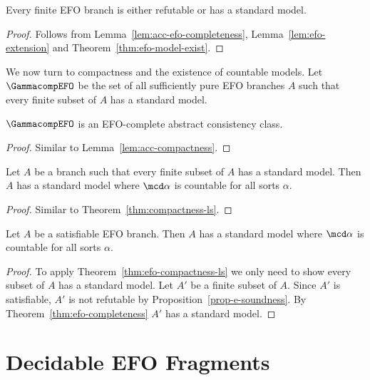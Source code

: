 \begin{thm}
  \label{thm:efo-completeness}
  Every finite EFO branch is either refutable
  or has a standard model.
\end{thm}
\begin{proof}
  Follows from Lemma~\ref{lem:acc-efo-completeness}, Lemma~\ref{lem:efo-extension} and
  Theorem~\ref{thm:efo-model-exist}.
\end{proof}

We now turn to compactness and the existence of countable models.
Let $\GammacompEFO$ be the set of all sufficiently pure
EFO branches $A$ such that every finite subset of $A$ has a standard model.

\begin{lem}
  \label{lem:acc-efo-compactness}
  $\GammacompEFO$ is an EFO-complete abstract consistency
  class.
\end{lem}
\begin{proof}  Similar to Lemma~\ref{lem:acc-compactness}.
\end{proof}

\begin{thm}\label{thm:efo-compactness-ls}
  Let $A$ be a branch such that every finite subset of
  $A$ has a standard model.  Then $A$ has a standard model where $\mcd\alpha$ is countable for all sorts $\alpha$.
\end{thm}
\begin{proof}  Similar to Theorem~\ref{thm:compactness-ls}.
\end{proof}

\begin{cor}\label{cor:efo-stdsat}
  Let $A$ be a satisfiable EFO branch.
  Then $A$ has a standard model where $\mcd\alpha$ is countable for all sorts $\alpha$.
\end{cor}
\begin{proof}
  To apply Theorem~\ref{thm:efo-compactness-ls}
  we only need to show every subset of $A$ has a standard model.
  Let $A'$ be a finite subset of $A$.
  Since $A'$ is satisfiable, $A'$ is not refutable by Proposition~\ref{prop-e-soundness}.
  By Theorem~\ref{thm:efo-completeness} $A'$ has a standard model.
\end{proof}

\section{Decidable EFO Fragments}

